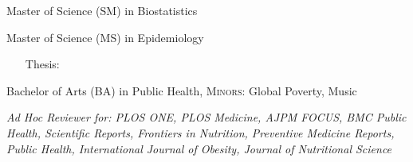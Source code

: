 \documentclass{cv_style}
\begin{document}
\parskip -4pt \noindent Master of Science (SM) in Biostatistics

\parskip -4pt Master of Science (MS) in Epidemiology \\
    \vspace{-1em}
    \begingroup
    \addtolength{\leftmargini}{3em} \begin{itemize}
        \item[\hspace{1em}Thesis:] 
    \end{itemize}
    \endgroup
\parskip -8pt  

\parskip -4pt \noindent  Bachelor of Arts (BA) in Public Health, \textsc{Minors:} Global Poverty, Music


\parskip -5pt 
\nocite{*}
\printbibliography[title=Publications]

\vspace{2em}

\textit{Ad Hoc Reviewer for: PLOS ONE, PLOS Medicine, AJPM FOCUS, BMC Public Health, Scientific Reports, Frontiers in Nutrition, Preventive Medicine Reports, Public Health, International Journal of Obesity, Journal of Nutritional Science}
\end{document}
